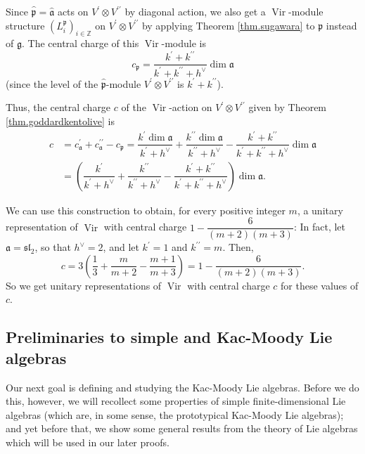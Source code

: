 \documentclass[etingof-lie.tex]{subfiles}
\begin{document}
\begin{example}
Since $\widehat{\mathfrak{p}}=\widehat{\mathfrak{a}}$ acts on $V^{\prime
}\otimes V^{\prime\prime}$ by diagonal action, we also get a
$\operatorname*{Vir}$-module structure $\left(  L_{i}^{\mathfrak{p}}\right)
_{i\in\mathbb{Z}}$ on $V^{\prime}\otimes V^{\prime\prime}$ by applying Theorem
\ref{thm.sugawara} to $\mathfrak{p}$ instead of $\mathfrak{g}$. The central
charge of this $\operatorname*{Vir}$-module is
\[
c_{\mathfrak{p}}=\dfrac{k^{\prime}+k^{\prime\prime}}{k^{\prime}+k^{\prime
\prime}+h^{\vee}}\dim\mathfrak{a}%
\]
(since the level of the $\widehat{\mathfrak{p}}$-module $V^{\prime}\otimes
V^{\prime\prime}$ is $k^{\prime}+k^{\prime\prime}$).

Thus, the central charge $c$ of the $\operatorname*{Vir}$-action on
$V^{\prime}\otimes V^{\prime\prime}$ given by Theorem
\ref{thm.goddardkentolive} is%
\begin{align*}
c  &  =c_{\mathfrak{a}}^{\prime}+c_{\mathfrak{a}}^{\prime\prime}%
-c_{\mathfrak{p}}=\dfrac{k^{\prime}\dim\mathfrak{a}}{k^{\prime}+h^{\vee}%
}+\dfrac{k^{\prime\prime}\dim\mathfrak{a}}{k^{\prime\prime}+h^{\vee}}%
-\dfrac{k^{\prime}+k^{\prime\prime}}{k^{\prime}+k^{\prime\prime}+h^{\vee}}%
\dim\mathfrak{a}\\
&  =\left(  \dfrac{k^{\prime}}{k^{\prime}+h^{\vee}}+\dfrac{k^{\prime\prime}%
}{k^{\prime\prime}+h^{\vee}}-\dfrac{k^{\prime}+k^{\prime\prime}}{k^{\prime
}+k^{\prime\prime}+h^{\vee}}\right)  \dim\mathfrak{a}.
\end{align*}


We can use this construction to obtain, for every positive integer $m$, a
unitary representation of $\operatorname*{Vir}$ with central charge
$1-\dfrac{6}{\left(  m+2\right)  \left(  m+3\right)  }$: In fact, let
$\mathfrak{a}=\mathfrak{sl}_{2}$, so that $h^{\vee}=2$, and let $k^{\prime}=1$
and $k^{\prime\prime}=m$. Then,%
\[
c=3\left(  \dfrac{1}{3}+\dfrac{m}{m+2}-\dfrac{m+1}{m+3}\right)  =1-\dfrac
{6}{\left(  m+2\right)  \left(  m+3\right)  }.
\]
So we get unitary representations of $\operatorname*{Vir}$ with central charge
$c$ for these values of $c$.
\end{example}

\subsection{\label{subsect.prelims}Preliminaries to simple and Kac-Moody Lie
algebras}

Our next goal is defining and studying the Kac-Moody Lie algebras. Before we
do this, however, we will recollect some properties of simple
finite-dimensional Lie algebras (which are, in some sense, the prototypical
Kac-Moody Lie algebras); and yet before that, we show some general results
from the theory of Lie algebras which will be used in our later proofs.
\end{document}

